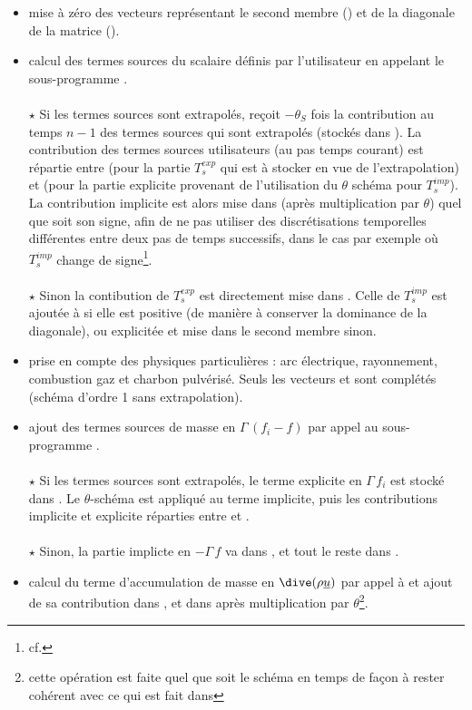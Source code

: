 \begin{itemize}
\item mise \`{a} z\'{e}ro des vecteurs repr\'{e}sentant le second membre () et
de la diagonale de la matrice ().
\item calcul des termes sources du scalaire d\'{e}finis par l'utilisateur en
appelant le sous-programme .
\\\\
$\star$ Si les termes sources sont extrapol\'{e}s,  reçoit $-\theta_S$
fois la contribution au temps $n-1$ des termes sources qui sont extrapol\'{e}s
(stock\'{e}s dans ). La contribution des termes sources utilisateurs (au
pas temps courant) est r\'{e}partie entre  (pour la partie $T_s^{exp}$
qui est \`{a} stocker en vue de l'extrapolation) et  (pour la partie
explicite provenant de l'utilisation du $\theta$ sch\'{e}ma pour $T_s^{imp}$). La
contribution implicite est alors mise dans  (apr\`{e}s multiplication
par $\theta$) quel que soit son signe, afin de ne pas utiliser des
discr\'{e}tisations temporelles diff\'{e}rentes entre deux pas de temps successifs, dans
le cas par exemple o\`{u} $T_s^{imp}$ change de signe\footnote{cf. }.
\\\\
$\star$ Sinon la contibution de $T_s^{exp}$ est directement mise dans
. Celle de $T_s^{imp}$ est ajout\'{e}e \`{a}  si elle est
positive (de mani\`{e}re \`{a} conserver la dominance de la diagonale), ou explicit\'{e}e et
mise dans le second membre sinon.
\\
\item prise en compte des physiques particuli\`{e}res : arc \'{e}lectrique, rayonnement,
combustion gaz et charbon pulv\'{e}ris\'{e}. Seuls les vecteurs  et
 sont compl\'{e}t\'{e}s (sch\'{e}ma d'ordre 1 sans extrapolation).
\item ajout des termes sources de masse en $\Gamma\,(f_i-f)$ par appel au sous-programme .
\\\\
$\star$ Si les termes sources sont extrapol\'{e}s, le terme explicite en
$\Gamma\,f_i$ est stock\'{e} dans . Le $\theta$-sch\'{e}ma est appliqu\'{e} au
terme implicite, puis les contributions implicite et explicite r\'{e}parties entre
 et .
\\\\
$\star$ Sinon, la partie implicte en $-\Gamma\,f$ va dans , et tout le reste dans .
\\
\item calcul du terme d'accumulation de masse en $\dive(\rho \underline{u})$ par
appel \`a  et ajout de sa contribution dans , et dans
 apr\`{e}s multiplication par $\theta$\footnote{cette op\'{e}ration est
faite quel que soit le sch\'{e}ma en temps de façon \`{a} rester coh\'{e}rent avec ce qui
est fait dans }.


\end{itemize}
